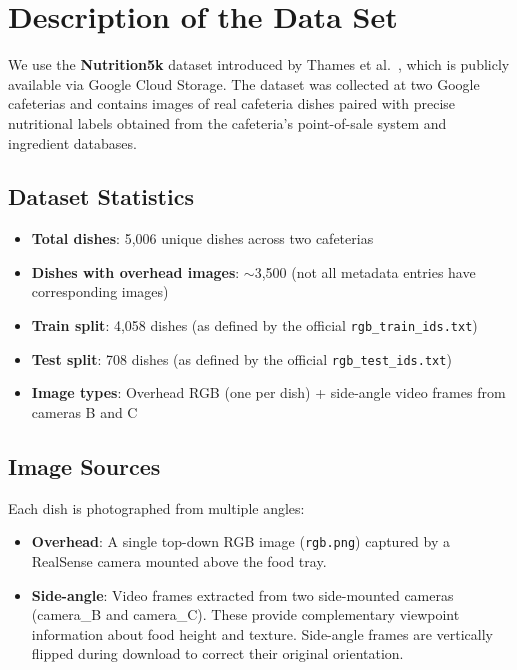 \documentclass[11pt,a4paper]{article}
\begin{document}
\section{Description of the Data Set}
\label{sec:dataset}

We use the \textbf{Nutrition5k} dataset introduced by Thames et al.\ \cite{thames2021}, which is publicly available via Google Cloud Storage. The dataset was collected at two Google cafeterias and contains images of real cafeteria dishes paired with precise nutritional labels obtained from the cafeteria's point-of-sale system and ingredient databases.

\subsection{Dataset Statistics}

\begin{itemize}
  \item \textbf{Total dishes}: 5,006 unique dishes across two cafeterias
  \item \textbf{Dishes with overhead images}: $\sim$3,500 (not all metadata entries have corresponding images)
  \item \textbf{Train split}: 4,058 dishes (as defined by the official \texttt{rgb\_train\_ids.txt})
  \item \textbf{Test split}: 708 dishes (as defined by the official \texttt{rgb\_test\_ids.txt})
  \item \textbf{Image types}: Overhead RGB (one per dish) + side-angle video frames from cameras B and C
\end{itemize}

\subsection{Image Sources}

Each dish is photographed from multiple angles:
\begin{itemize}
  \item \textbf{Overhead}: A single top-down RGB image (\texttt{rgb.png}) captured by a RealSense camera mounted above the food tray.
  \item \textbf{Side-angle}: Video frames extracted from two side-mounted cameras (camera\_B and camera\_C). These provide complementary viewpoint information about food height and texture. Side-angle frames are vertically flipped during download to correct their original orientation.
\end{itemize}
\end{document}
